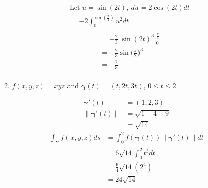\documentclass{article}
\newcommand{\norm}[1]{\| #1 \|}
\begin{document}
\begin{enumerate}
\begin{enumerate}
\begin{multicols}{2}
\begin{align*}
        &\text{Let } u = \sin(2t),\: du = 2\cos(2t)dt \\
        &= -2 \int_0^{\sin(\frac{\pi}{4})} u^2 dt \\
    \end{align*}
    \begin{align*} 
        &= -\frac{2}{3} \Big[\sin(2t)^3\Big]_0^{\frac{\pi}{4}} \\
        &= -\frac{2}{3} \sin\Big(\frac{\pi}{2}\Big)^3 \\
        &= -\frac{2}{3} \\
    \end{align*}
    \end{multicols}
    
    \item $f(x,y,z) = xyz$ and $\boldsymbol{\gamma}(t) = (t,2t,3t)$, $0\leq t \leq 2$.
    \begin{multicols}{2} 
    \noindent
    \begin{align*} 
        \boldsymbol{\gamma}'(t) &= (1,2,3) \\
        \norm{\boldsymbol{\gamma}'(t)} &= \sqrt{1 + 4 + 9} \\
        &= \sqrt{14}
    \end{align*}
    \begin{align*} 
        \int_{\boldsymbol{\gamma}}f(x,y,z)ds &= \int_0^2 f(\boldsymbol{\gamma}(t)) \norm{\boldsymbol{\gamma}'(t)}dt \\
        &= 6\sqrt{14} \int_0^2 t^3 dt\\
        &= \frac{6}{4}\sqrt{14}(2^4) \\ 
        &= 24\sqrt{14}
    \end{align*}
    \end{multicols}


\end{enumerate}
\end{enumerate}
\end{document}
